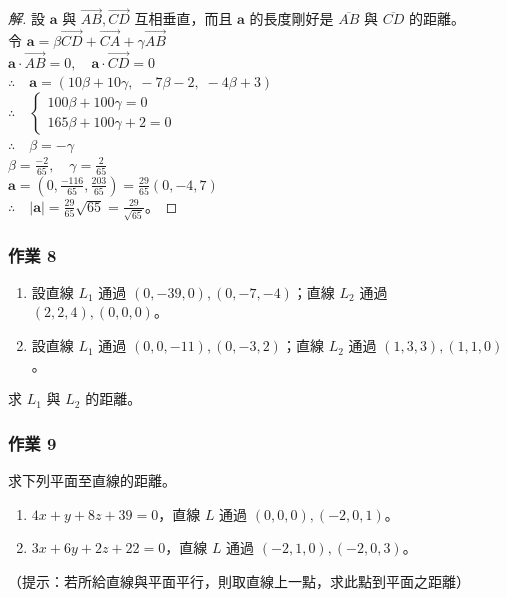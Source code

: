 \begin{proof}[解]
設 $\mathbf{a}$ 與 $\vec{AB}, \vec{CD}$ 互相垂直，而且 $\mathbf{a}$ 的長度剛好是 $\overline{AB}$ 與 $\overline{CD}$ 的距離。\\
令 $\mathbf{a} = \beta \vec{CD} + \vec{CA} + \gamma \vec{AB}$ \\
$\mathbf{a} \cdot \vec{AB} = 0,\quad \mathbf{a} \cdot \vec{CD} = 0$ \\
$\therefore\quad \mathbf{a} = (10\beta + 10\gamma,\; -7\beta - 2,\; -4\beta + 3)$ \\
$\therefore\quad \begin{cases} 100\beta + 100\gamma = 0 \\ 165\beta + 100\gamma + 2 = 0 \end{cases}$ \\
$\therefore\quad \beta = -\gamma$ \\
$\beta = \frac{-2}{65},\quad \gamma = \frac{2}{65}$ \\
$\mathbf{a} = \left( 0, \frac{-116}{65}, \frac{203}{65} \right) = \frac{29}{65}(0, -4, 7)$ \\
$\therefore\quad |\mathbf{a}| = \frac{29}{65}\sqrt{65} = \frac{29}{\sqrt{65}}$。
\end{proof}

\subsubsection*{作業 8}
\begin{enumerate}[label=(\roman*), leftmargin=2.5em]
  \item 設直線 $L_1$ 通過 $(0, -39, 0), (0, -7, -4)$；直線 $L_2$ 通過 $(2, 2, 4), (0, 0, 0)$。
  \item 設直線 $L_1$ 通過 $(0, 0, -11), (0, -3, 2)$；直線 $L_2$ 通過 $(1, 3, 3), (1, 1, 0)$。
\end{enumerate}
求 $L_1$ 與 $L_2$ 的距離。

\subsubsection*{作業 9}
求下列平面至直線的距離。
\begin{enumerate}[label=(\roman*), leftmargin=2.5em]
  \item $4x + y + 8z + 39 = 0$，直線 $L$ 通過 $(0, 0, 0), (-2, 0, 1)$。
  \item $3x + 6y + 2z + 22 = 0$，直線 $L$ 通過 $(-2, 1, 0), (-2, 0, 3)$。
\end{enumerate}
（提示：若所給直線與平面平行，則取直線上一點，求此點到平面之距離）

